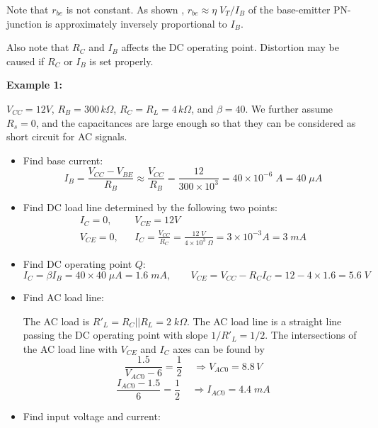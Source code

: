 \begin{itemize}
\begin{itemize}
  Note that $r_{be}$ is not constant. As shown 
  , 
  $r_{be}\approx \eta\;V_T/I_B$ of the base-emitter PN-junction is 
  approximately inversely proportional to $I_B$.

  Also note that $R_C$ and $I_B$ affects the DC operating point.
  Distortion may be caused if $R_C$ or $I_B$ is set properly.
  
\end{itemize}

{\bf Example 1:} 


$V_{CC}=12V$, $R_B=300\,k\Omega$, $R_C=R_L=4\,k\Omega$, and $\beta=40$. 
We further assume $R_s=0$, and the capacitances are large enough so 
that they can be considered as short circuit for AC signals.


\begin{itemize}
\item Find base current:
  \[
  I_B=\frac{V_{CC}-V_{BE}}{R_B} \approx \frac{V_{CC}}{R_B}=\frac{12}{300\times 10^3}
  =40\times 10^{-6}\; A=40\;\mu A	
  \]

\item Find DC load line determined by the following two points:
  \begin{eqnarray}
    I_C=0, && V_{CE}=12V\nonumber\\
    V_{CE}=0, && I_C=\frac{V_{CC}}{R_C}=\frac{12\;V}{4\times 10^3\;\Omega}
    =3\times 10^{-3}A=3 \;mA
    \nonumber
  \end{eqnarray}

\item Find DC operating point $Q$: 
  \[
  I_C=\beta I_B=40\times 40\;\mu A=1.6\;mA,\;\;\;\;\;\;\;
  V_{CE}=V_{CC}-R_CI_C=12-4\times 1.6=5.6\;V
  \]

\item Find AC load line: 

  The AC load is $R'_L=R_C||R_L=2\;k\Omega$. The AC load line is a 
  straight line passing the DC operating point with slope $1/R'_L=1/2$.
  The intersections of the AC load line with $V_{CE}$ and $I_C$ axes can 
  be found by
  \[
  \frac{1.5}{V_{AC0}-6}=\frac{1}{2}\;\;\;\;\Longrightarrow V_{AC0}=8.8\,V
  \]
  \[
  \frac{I_{AC0}-1.5}{6}=\frac{1}{2}\;\;\;\;\Longrightarrow I_{AC0}=4.4\;mA 
  \]
\item Find input voltage and current:
  

\end{itemize}
\end{itemize}
